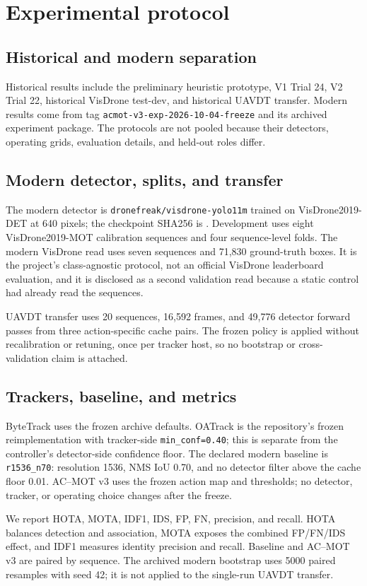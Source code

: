 \section{Experimental protocol}
\subsection{Historical and modern separation}
Historical results include the preliminary heuristic prototype, V1 Trial 24,
V2 Trial 22, historical VisDrone test-dev, and historical UAVDT transfer.
Modern results come from tag \texttt{acmot-v3-exp-2026-10-04-freeze} and its
archived experiment package. The protocols are not pooled because their
detectors, operating grids, evaluation details, and held-out roles differ.

\subsection{Modern detector, splits, and transfer}
The modern detector is \texttt{dronefreak/visdrone-yolo11m} trained on
VisDrone2019-DET at 640 pixels; the checkpoint SHA256 is \checkpointsha.
Development uses eight VisDrone2019-MOT calibration sequences and four
sequence-level folds. The modern VisDrone read uses seven sequences and 71,830
ground-truth boxes. It is the project's class-agnostic protocol, not an
official VisDrone leaderboard evaluation, and it is disclosed as a second
validation read because a static control had already read the sequences.

UAVDT transfer uses 20 sequences, 16,592 frames, and 49,776 detector forward
passes from three action-specific cache pairs. The frozen policy is applied
without recalibration or retuning, once per tracker host, so no bootstrap or
cross-validation claim is attached.

\subsection{Trackers, baseline, and metrics}
ByteTrack uses the frozen archive defaults. OATrack is the repository's frozen
reimplementation with tracker-side \texttt{min\_conf=0.40}; this is separate
from the controller's detector-side confidence floor. The declared modern baseline is
\texttt{r1536\_n70}: resolution 1536, NMS IoU 0.70, and no detector filter
above the cache floor 0.01. AC--MOT v3 uses the frozen action map and thresholds; no
detector, tracker, or operating choice changes after the freeze.

We report HOTA, MOTA, IDF1, IDS, FP, FN, precision, and recall. HOTA balances
detection and association, MOTA exposes the combined FP/FN/IDS effect, and
IDF1 measures identity precision and recall. Baseline and AC--MOT v3 are paired by
sequence. The archived modern bootstrap uses 5000 paired resamples with seed
42; it is not applied to the single-run UAVDT transfer.

